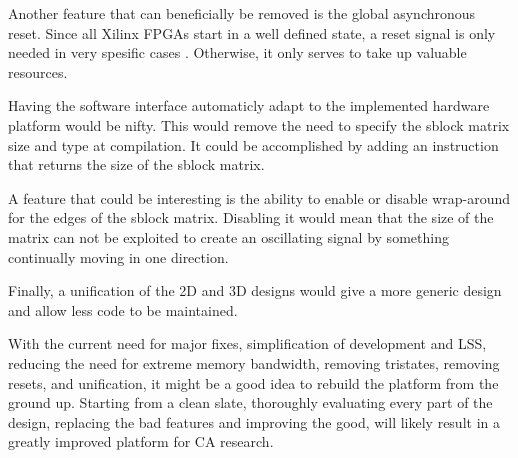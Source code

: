 Another feature that can beneficially be removed is the global asynchronous reset.
Since all Xilinx FPGAs start in a well defined state, a reset signal is only needed in very spesific cases \cite{ug687} \cite{wp272}.
Otherwise, it only serves to take up valuable resources.

Having the software interface automaticly adapt to the implemented hardware platform would be nifty.
This would remove the need to specify the sblock matrix size and type at compilation.
It could be accomplished by adding an instruction that returns the size of the sblock matrix.

A feature that could be interesting is the ability to enable or disable wrap-around for the edges of the sblock matrix.
Disabling it would mean that the size of the matrix can not be exploited to create an oscillating signal by something continually moving in one direction.

Finally, a unification of the 2D and 3D designs would give a more generic design and allow less code to be maintained.

With the current need for major fixes, simplification of development and LSS, reducing the need for extreme memory bandwidth, removing tristates, removing resets, and unification, it might be a good idea to rebuild the platform from the ground up.
Starting from a clean slate, thoroughly evaluating every part of the design, replacing the bad features and improving the good, will likely result in a greatly improved platform for CA research.

